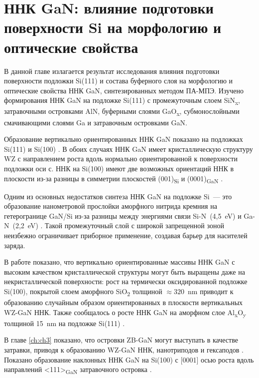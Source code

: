 \chapter{ННК GaN: влияние подготовки поверхности Si на морфологию и оптические свойства}\label{ch:ch4}

В данной главе излагается результат исследования влияния подготовки поверхности подложки Si(111) и состава буферного слоя на морфологию и оптические свойства ННК GaN, синтезированных методом ПА-МПЭ. Изучено формирования ННК GaN на подложке Si(111) с промежуточным слоем SiN\textsubscript{x}, затравочными островками AlN, буферными слоями GaO\textsubscript{x}, субмонослойными смачивающими слоями Ga и затравочным островками GaN.

Образование вертикально ориентированных ННК GaN показано на подложках Si(111) и Si(100) \cite{Corfdir2009}. В обоих случаях ННК GaN имеет кристаллическую структуру WZ с направлением роста вдоль нормально ориентированной к поверхности подложки оси с. ННК на Si(100) имеют две возможных ориентаций ННК в плоскости из-за разницы в симметрии плоскостей (001)\textsubscript{Si} и (0001)\textsubscript{GaN} \cite{Largeau2008}.

Одним из основных недостатков синтеза ННК GaN на подложке Si~--- это образование нанометровой прослойки аморфного нитрида кремния на гетерогранице GaN/Si из-за разницы между энергиями связи Si-N~(4,5~\si{\electronvolt}) и Ga-N~(2,2~\si{\electronvolt}) \cite{Stoica2008}. Такой промежуточный слой с широкой запрещенной зоной неизбежно ограничивает приборное применение, создавая барьер для насителей заряда.

В работе \cite{Stoica2008} показано, что вертикально ориентированные массивы ННК GaN с высоким качеством кристаллической структуры могут быть выращены даже на некристаллической поверхности: рост на термически оксидированной подложке Si(100), покрытой слоем аморфного SiO\textsubscript{2} толщиной \(\approx 320\)~\si{\nano\meter} приводит к образованию случайным образом ориентированных в плоскости вертикальных WZ-GaN ННК.
Также сообщалось о росте ННК GaN на аморфном слое Al\textsubscript{x}O\textsubscript{y} толщиной 15~\si{\nano\meter} на подложке Si(111) \cite{Sobanska2016}.

В главе \cref{ch:ch3} показано, что островки ZB-GaN могут выступать в качестве затравки, приводя к образованию WZ-GaN ННК, нанотриподов и гексаподов \cite{Lee2010, Wang2017}. Показано образование наклонных ННК GaN на Si(100) с [0001] осью роста вдоль направлений <111>\textsubscript{GaN} затравочного островка \cite{Borysiuk2014}.

